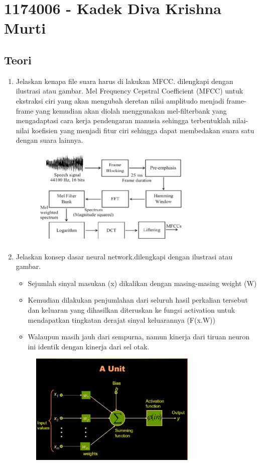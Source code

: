 \section{1174006 - Kadek Diva Krishna Murti}

\subsection{Teori}
\begin{enumerate}
	\item Jelaskan kenapa file suara harus di lakukan MFCC. dilengkapi dengan ilustrasi atau gambar.
	\hfill\break
	Mel Frequency Cepstral Coefficient (MFCC) untuk ekstraksi ciri yang akan mengubah deretan nilai amplitudo menjadi frame-frame yang kemudian akan diolah menggunakan mel-filterbank yang mengadaptasi cara kerja pendengaran manusia sehingga terbentuklah nilai-nilai koefisien yang menjadi fitur ciri sehingga dapat membedakan suara satu dengan suara lainnya.
	\hfill\break
	\begin{figure}[H]
		\includegraphics[width=8cm]{figures/1174006/chapter6/teori/mfcc.png}
		\centering
	\end{figure}
	\item Jelaskan konsep dasar neural network.dilengkapi dengan ilustrasi atau gambar.
	\hfill\break
	\begin{itemize}
		\item Sejumlah sinyal masukan (x) dikalikan dengan masing-masing weight (W) 
		\item Kemudian dilakukan penjumlahan dari seluruh hasil perkalian tersebut dan keluaran yang dihasilkan diteruskan ke fungsi activation untuk mendapatkan tingkatan derajat sinyal keluarannya (F(x.W))
		\item Walaupun masih jauh dari sempurna, namun kinerja dari tiruan neuron ini identik dengan kinerja dari sel otak.
	\end{itemize}
	\hfill\break
	\begin{figure}[H]
		\includegraphics[width=8cm]{figures/1174006/chapter6/teori/neuron.png}

\end{figure}
\end{enumerate}
